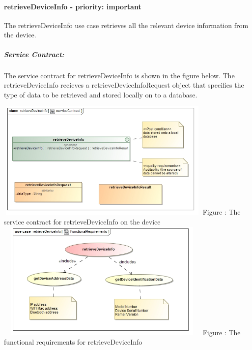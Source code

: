 \documentclass[hidelinks, 12pt, oneside]{article}
\begin{document}
	\paragraph{retrieveDeviceInfo - priority: important}
		The retrieveDeviceInfo use case retrieves all the relevant device information from the device.\newline
		
		\subparagraph{Service Contract:}
		The service contract for retrieveDeviceInfo is shown in the figure below. The retrieveDeviceInfo 			recieves a retrieveDeviceInfoRequest object that specifies the type of data to be retrieved and 			stored locally on to a database.
		
		\includegraphics[width=400px,height=220px]{img/serviceContractRetrieveDeviceInfo.jpg}
		Figure : The service contract for retrieveDeviceInfo on the device
		\newline
		\includegraphics[width=400px,height=220px]{img/functionalRequirementsRetrieveDeviceInfo.jpg}
		Figure : The functional requirements for retrieveDeviceInfo
		\newline
		
\end{document}
